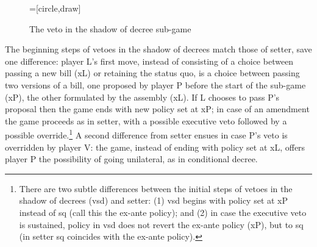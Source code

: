 \begin{figure}
  \begin{center}
    =[circle,draw]
    \caption{The veto in the shadow of decree sub-game}\label{f:vetoShadowDecreeGame}
  \end{center}
\end{figure}

The beginning steps of vetoes in the shadow of decrees match those of setter, save one difference: player L's first move, instead of consisting of a choice between passing a new bill (xL) or retaining the status quo, is a choice between passing two versions of a bill, one proposed by player P before the start of the sub-game (xP), the other formulated by the assembly (xL).  If L chooses to pass P's proposal then the game ends with new policy set at xP; in case of an amendment the game proceeds as in setter, with a possible executive veto followed by a possible override.\footnote{There are two subtle differences between the initial steps of vetoes in the shadow of decrees (vsd) and setter: (1) vsd begins with policy set at xP instead of sq (call this the ex-ante policy); and (2) in case the executive veto is sustained, policy in vsd does not revert the ex-ante policy (xP), but to sq (in setter sq coincides with the ex-ante policy).}  A second difference from setter ensues in case P's veto is overridden by player V: the game, instead of ending with policy set at xL, offers player P the possibility of going unilateral, as in conditional decree.  

